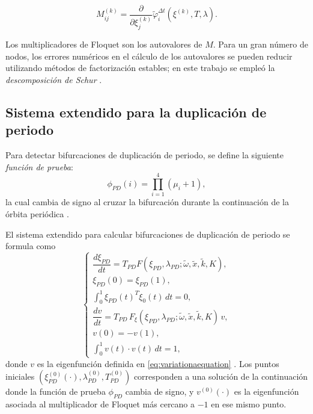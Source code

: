 \begin{equation}
    M^{(k)}_{ij} = \frac{\partial}{\partial \xi^{(k)}_j} \tilde{\varphi}_{i}^{\Delta t}(\xi^{(k)}, T, \lambda).
\end{equation}

Los multiplicadores de Floquet son los autovalores de \(M\). Para un gran número de nodos, los errores numéricos en el
cálculo de los autovalores se pueden reducir utilizando métodos de factorización estables; en este trabajo se
empleó la \emph{descomposición de Schur} \cite{FloquetMultipliers}.


\subsection{Sistema extendido para la duplicación de periodo}

Para detectar bifurcaciones de duplicación de periodo, se define la siguiente \emph{función de prueba}:
\begin{equation}
    \phi_{PD}(i) = \prod_{i=1}^{4} (\mu_i + 1),
    \label{PDtest}
\end{equation}
la cual cambia de signo al cruzar la bifurcación durante la continuación de la órbita periódica \cite{Meijer2011}.

El sistema extendido para calcular bifurcaciones de duplicación de periodo se formula como
\begin{equation}
    \begin{cases}
        \dfrac{d\xi_{PD}}{dt} = T_{PD} F(\xi_{PD}, \lambda_{PD}; \tilde{\omega}, \tilde{x}, \tilde{k}, K),      \\[1mm]
        \xi_{PD}(0) = \xi_{PD}(1),                                                                              \\[1mm]
        \int_0^1 \xi_{PD}(t)^{T} \dot{\xi}_0(t) \, dt = 0,                                                      \\[1mm]
        \dfrac{dv}{dt} = T_{PD}\, F_{\xi}(\xi_{PD}, \lambda_{PD}; \tilde{\omega}, \tilde{x}, \tilde{k}, K)\, v, \\[1.5mm]
        v(0) = -v(1),                                                                                           \\[1mm]
        \int_0^1 v(t) \cdot v(t)\, dt = 1,
    \end{cases}
    \label{eq:pd_system_general}
\end{equation}
donde $v$ es la eigenfunción definida en \eqref{eq:variationaequation} \cite{Meijer2011}.
Los puntos iniciales $\left(\xi_{PD}^{(0)}(\cdot), \lambda_{PD}^{(0)}, T_{PD}^{(0)}\right)$ corresponden a una
solución de la continuación donde la función de prueba $\phi_{PD}$ cambia de signo, y $v^{(0)}(\cdot)$
es la eigenfunción asociada al multiplicador de Floquet más cercano a $-1$ en ese mismo punto.

